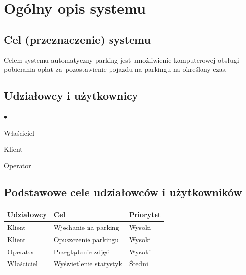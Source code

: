 \chapter{Ogólny opis systemu}
\label{cha:wprowadzenie}


\section{Cel (przeznaczenie) systemu}
\label{sec:celePracy}

Celem systemu automatyczny parking jest umożliwienie komputerowej obsługi pobierania opłat za~pozostawienie pojazdu na parkingu na określony czas.

\section{Udziałowcy i użytkownicy}

\begin{list}{$\bullet$}{}
\item Właściciel
\item Klient
\item Operator
\end{list}

\section{Podstawowe cele udziałowców i użytkowników}

\begin{table}[H]
	\begin{tabular}{|l|l|l|} \hline
	\textbf{Udziałowcy}	& \textbf{Cel} & \textbf{Priorytet} \\ \hline%
	Klient	& Wjechanie na parking & Wysoki \\
	Klient	& Opuszczenie parkingu & Wysoki \\
	Operator& Przeglądanie zdjęć & Wysoki \\
	Właściciel& Wyświetlenie statystyk & Średni \\ \hline
	\end{tabular}
\end{table}

